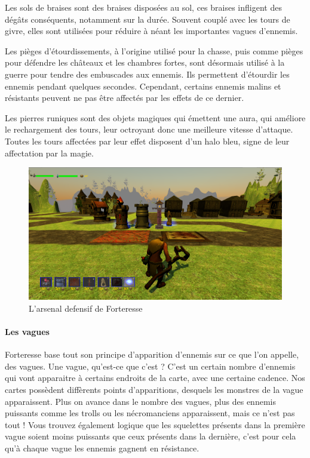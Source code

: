 \documentclass[a4paper, 12pt]{article}
\begin{document}
\par Les sols de braises sont des braises disposées au sol, ces braises infligent des dégâts conséquents, notamment sur la durée. Souvent couplé avec les tours de givre, elles sont utilisées pour réduire à néant les importantes vagues d’ennemis.
\par Les pièges d’étourdissements, à l’origine utilisé pour la chasse, puis comme pièges pour défendre les châteaux et les chambres fortes, sont désormais utilis\'e à la guerre pour tendre des embuscades aux ennemis. Ils permettent d’étourdir les ennemis pendant quelques secondes. Cependant, certains ennemis malins et résistants peuvent ne pas être affectés par les effets de ce dernier.
\par Les pierres runiques sont des objets magiques qui émettent une aura, qui améliore le rechargement des tours, leur octroyant donc une meilleure vitesse d’attaque. Toutes les tours affectées par leur effet disposent d’un halo bleu, signe de leur affectation par la magie.
\begin{figure}[!ht]
\centerline{\includegraphics[scale=0.3]{Tours.png}}
\caption*{L'arsenal defensif de Forteresse}
\end{figure}
			\paragraph{Les vagues}
			
			Forteresse base tout son principe d’apparition d’ennemis sur ce que l’on appelle, des vagues. Une vague, qu’est-ce que c’est ? C’est un certain nombre d’ennemis qui vont apparaitre à certains endroits de la carte, avec une certaine cadence. Nos cartes possèdent diffèrents points d’apparitions, desquels les monstres de la vague apparaissent.
Plus on avance dans le nombre des vagues, plus des ennemis puissants comme les trolls ou les nécromanciens apparaissent, mais ce n’est pas tout ! Vous trouvez également logique que les squelettes présents dans la première vague soient moins puissants que ceux présents dans la dernière, c’est pour cela qu’à chaque vague les ennemis gagnent en résistance.
\end{document}
